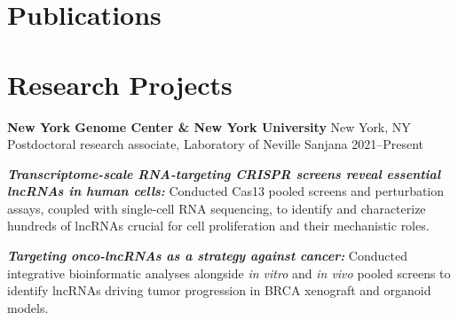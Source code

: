 \documentclass[letterpaper,11pt]{cv}
\begin{document}
\section{Publications}

\nocite{*}

\printbibliography[
    keyword={primary},
    heading=subbibliography,
    title={First authorship \footnotesize (* Equal contribution)}
    ]

\printbibliography[
    keyword={contributing},
    heading=subbibliography,
    title={Co-authorship \footnotesize (*,+ Equal contribution)}
    ]
    \section{Research Projects}
    \justifying
    \begin{entrylist}
    \raggedleft
    \item \textbf{New York Genome Center \& New York University} \hfill New York, NY\\
    Postdoctoral research associate, {Laboratory of Neville Sanjana } \hfill
    2021--Present
    \begin{detaillist}
        \item \textit{\textbf{Transcriptome-scale RNA-targeting CRISPR screens reveal essential lncRNAs in human cells:}} Conducted Cas13 pooled screens and perturbation assays, coupled with single-cell RNA sequencing, to identify and characterize hundreds of lncRNAs crucial for cell proliferation and their mechanistic roles.
        \item \textit{\textbf{Targeting onco-lncRNAs as a strategy against cancer:}} Conducted integrative bioinformatic analyses alongside \textit{in vitro} and \textit{in vivo} pooled screens to identify lncRNAs driving tumor progression in BRCA xenograft and organoid models. 
    \end{detaillist}
    

\end{entrylist}
\end{document}
